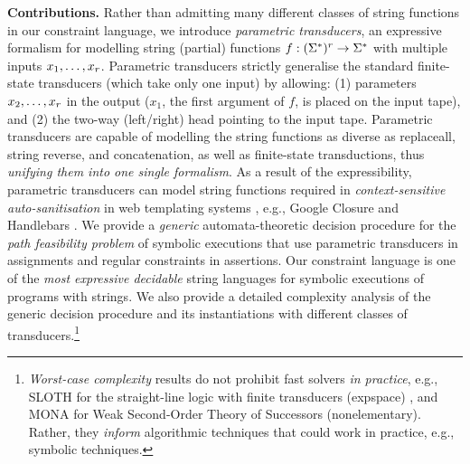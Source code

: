
\smallskip
\noindent
\textbf{Contributions.} Rather than admitting many different classes of string 
functions in our constraint language, we introduce \emph{parametric 
transducers}, an expressive formalism for modelling string (partial) functions 
$f: (\Sigma^*)^r \to \Sigma^*$ with multiple inputs $x_1,\ldots, 
x_r$. Parametric
transducers strictly generalise the standard finite-state transducers (which take only
one input) by allowing: (1) parameters $x_2,\ldots,x_r$ in the output
($x_1$, the first argument of $f$, is placed on the input tape), 
and (2) the two-way (left/right) head pointing to the input tape. 
Parametric transducers are capable of modelling the string functions as 
diverse as replaceall, string reverse, and concatenation, as well as finite-state transductions, thus \emph{unifying them into one single formalism}.
As a result of the expressibility, parametric transducers can model string functions required in \emph{context-sensitive
auto-sanitisation} in web templating systems \cite{SSS11}, e.g., Google Closure 
\cite{Closure} and Handlebars \cite{Handlebars}. 
We provide a \emph{generic} automata-theoretic decision procedure for the \emph{path 
feasibility problem} of symbolic executions that use parametric transducers in 
assignments and regular constraints in assertions. Our constraint language
is one of the \emph{most expressive decidable} string languages for symbolic 
executions of programs with strings.
%
We also provide a detailed complexity 
analysis of the generic decision procedure and its instantiations with different classes of transducers.\footnote{
\emph{Worst-case complexity} results  do not prohibit fast solvers 
\emph{in practice}, e.g., SLOTH for the straight-line 
logic with finite transducers ({\sc expspace}) 
\cite{HJLRV18}, and MONA for Weak Second-Order
Theory of Successors ({\sc nonelementary}). Rather, they
\emph{inform} algorithmic techniques that could work in practice, e.g., 
symbolic techniques.}
%
